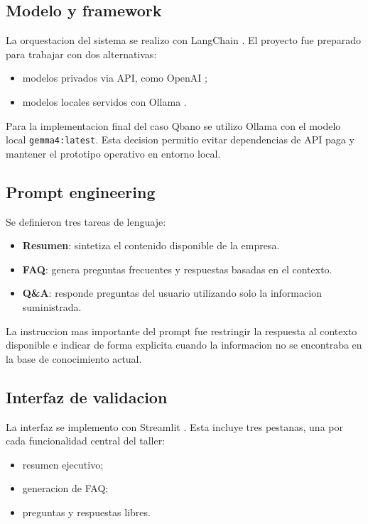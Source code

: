 \documentclass[journal]{IEEEtran}
\begin{document}
\subsection{Modelo y framework}
La orquestacion del sistema se realizo con LangChain \cite{langchain_docs}. El proyecto fue preparado para trabajar con dos alternativas:

\begin{itemize}
\item modelos privados via API, como OpenAI \cite{openai_api_docs};
\item modelos locales servidos con Ollama \cite{ollama_docs}.
\end{itemize}

Para la implementacion final del caso Qbano se utilizo Ollama \cite{ollama_docs} con el modelo local \texttt{gemma4:latest}. Esta decision permitio evitar dependencias de API paga y mantener el prototipo operativo en entorno local.

\subsection{Prompt engineering}
Se definieron tres tareas de lenguaje:

\begin{itemize}
\item \textbf{Resumen}: sintetiza el contenido disponible de la empresa.
\item \textbf{FAQ}: genera preguntas frecuentes y respuestas basadas en el contexto.
\item \textbf{Q\&A}: responde preguntas del usuario utilizando solo la informacion suministrada.
\end{itemize}

La instruccion mas importante del prompt fue restringir la respuesta al contexto disponible e indicar de forma explicita cuando la informacion no se encontraba en la base de conocimiento actual.

\subsection{Interfaz de validacion}
La interfaz se implemento con Streamlit \cite{streamlit_docs}. Esta incluye tres pestanas, una por cada funcionalidad central del taller:

\begin{itemize}
\item resumen ejecutivo;
\item generacion de FAQ;
\item preguntas y respuestas libres.
\end{itemize}
\end{document}
